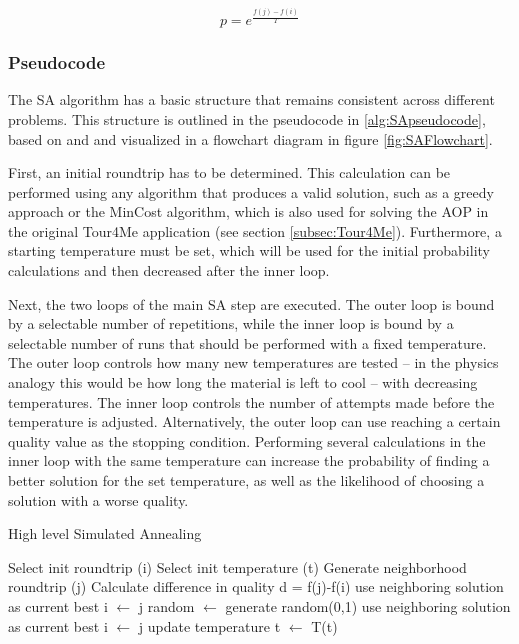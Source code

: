 \begin{equation}\label{eq:SAprobCalculation}
	p = e^{\frac{f(j)-f(i)}{T}}
\end{equation}



\subsubsection{Pseudocode}
\label{subsubsec:SAPseudocode}

The SA algorithm has a basic structure that remains consistent across different problems.
This structure is outlined in the pseudocode in \ref{alg:SApseudocode}, based on \cite{eglese_simulated_1990} and \cite{zhan_list-based_2016} and visualized in a flowchart diagram in figure \ref{fig:SAFlowchart}.

First, an initial roundtrip has to be determined. 
This calculation can be performed using any algorithm that produces a valid solution, such as a greedy approach or the MinCost algorithm, which is also used for solving the AOP in the original Tour4Me application (see section \ref{subsec:Tour4Me}).
Furthermore, a starting temperature must be set, which will be used for the initial probability calculations and then decreased after the inner loop.

Next, the two loops of the main SA step are executed.
The outer loop is bound by a selectable number of repetitions, while the inner loop is bound by a selectable number of runs that should be performed with a fixed temperature.
The outer loop controls how many new temperatures are tested -- in the physics analogy this would be how long the material is left to cool -- with decreasing temperatures.
The inner loop controls the number of attempts made before the temperature is adjusted. 
Alternatively, the outer loop can use reaching a certain quality value as the stopping condition.
Performing several calculations in the inner loop with the same temperature can increase the probability of finding a better solution for the set temperature, as well as the likelihood of choosing a solution with a worse quality.


\begin{breakablealgorithm}
	\caption{High level Simulated Annealing}
	\label{alg:SApseudocode}
	\begin{algorithmic}[1]
		\STATE Select init roundtrip (i)
		\STATE Select init temperature (t)
				\STATE Generate neighborhood roundtrip (j)
				\STATE Calculate difference in quality d = f(j)-f(i)
						\STATE use neighboring solution as current best i $\gets$ j
					\ELSE 
						\STATE random $\gets$ generate random(0,1)
							\STATE use neighboring solution as current best i $\gets$ j
						\ENDIF
					\ENDIF
			 \ENDFOR
			 \STATE update temperature t $\gets$ T(t)
		 \ENDFOR
	\end{algorithmic}
\end{breakablealgorithm}






